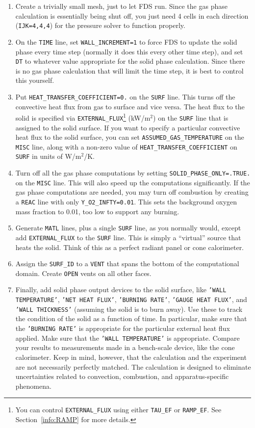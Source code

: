 \documentclass[11pt]{book}
\newcommand{\ct}{\tt\small}
\begin{document}
\begin{enumerate}
\item Create a trivially small mesh, just to let FDS run. Since the
gas phase calculation is essentially being shut off, you just need 4
cells in each direction ({\ct IJK=4,4,4}) for the pressure solver to
function properly.
\item On the {\ct TIME} line, set {\ct WALL\_INCREMENT=1} to force FDS
to update the solid phase every time step (normally it does this every
other time step), and set {\ct DT} to whatever value appropriate for
the solid phase calculation. Since there is no gas phase calculation
that will limit the time step, it is best to control this yourself.
\item Put {\ct HEAT\_TRANSFER\_COEFFICIENT=0.} on the {\ct SURF} line. This turns off the
convective heat flux from gas to surface and vice versa. The heat flux
to the solid is specified via {\ct EXTERNAL\_FLUX}\footnote{You can control {\ct EXTERNAL\_FLUX} using
either {\ct TAU\_EF} or {\ct RAMP\_EF}. See Section~\ref{info:RAMP} for more details.} (kW/m$^2$) on the
{\ct SURF} line that is assigned to the solid surface. If you want to specify a particular
convective heat flux to the solid surface, you can set {\ct ASSUMED\_GAS\_TEMPERATURE} on the
{\ct MISC} line, along with a non-zero value of {\ct HEAT\_TRANSFER\_COEFFICIENT} on {\ct SURF} in units of W/m$^2$/K.
\item Turn off all the gas phase computations by setting {\ct SOLID\_PHASE\_ONLY=.TRUE.}
on the {\ct MISC} line. This will also speed
up the computations significantly. If the gas phase computations are
needed, you may turn off combustion by creating a {\ct REAC} line with only
{\ct Y\_O2\_INFTY=0.01}. This sets the background oxygen mass fraction
to 0.01, too low to support any burning.
\item Generate {\ct MATL} lines, plus a single {\ct SURF} line, as you
normally would, except add {\ct EXTERNAL\_FLUX} to the {\ct SURF}
line. This is simply a ``virtual'' source that heats the solid. Think
of this as a perfect radiant panel or cone calorimeter.
\item Assign the {\ct SURF\_ID} to a {\ct VENT} that spans the bottom
of the computational domain. Create {\ct OPEN} vents on all other
faces.
\item Finally, add solid phase output devices to the solid surface,
like {\ct 'WALL TEMPERATURE'}, {\ct 'NET HEAT FLUX'}, {\ct 'BURNING RATE'},
{\ct 'GAUGE HEAT FLUX'}, and {\ct 'WALL THICKNESS'} (assuming the solid
is to burn away). Use these to track the condition of the solid as a
function of time. In particular, make sure that the {\ct 'BURNING RATE'} is appropriate for the particular external heat flux
applied. Make sure that the {\ct 'WALL TEMPERATURE'} is
appropriate. Compare your results to measurements made in a
bench-scale device, like the cone calorimeter. Keep in mind, however,
that the calculation and the experiment are not necessarily perfectly
matched. The calculation is designed to eliminate uncertainties
related to convection, combustion, and apparatus-specific phenomena.
\end{enumerate}
\end{document}
